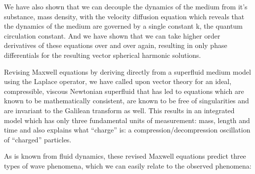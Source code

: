 \documentclass[a4paper]{article}
\newcommand\textstyleNone[1]{#1}
\begin{document}
{\color[rgb]{0.101960786,0.101960786,0.101960786}
\textstyleNone{We have also shown that we can decouple the dynamics of the medium from it's substance, mass density,
with the velocity diffusion equation which reveals that the dynamics of the medium are governed by a single constant
}\textstyleNone{k}\textstyleNone{, the quantum circulation constant. And we have shown that we can take higher order
derivatives of these equations over and over again, resulting in only phase differentials for the resulting vector
spherical harmonic solutions.}}

{
\textstyleNone{{Revising Maxwell equations by deriving directly from
a superfluid medium model using the Laplace operator, we have called upon vector theory for an ideal, compressible,
viscous Newtonian
}{super}{fluid
that has led to equations which are known to be mathematically consistent, are known to be free of singularities and
are invariant to the Galilean transform as well. This results in an integrated model which has only three fundamental
units of measurement: mass, length and time and also explains what ``charge'' is: a compression/decompression
oscillation of ``charged'' particles. }}}

{
\textstyleNone{{As is known from fluid dynamics, these revised
Maxwell equations predict three types of wave phenomena, which we can easily relate to the observed phenomena:}}}
\end{document}
